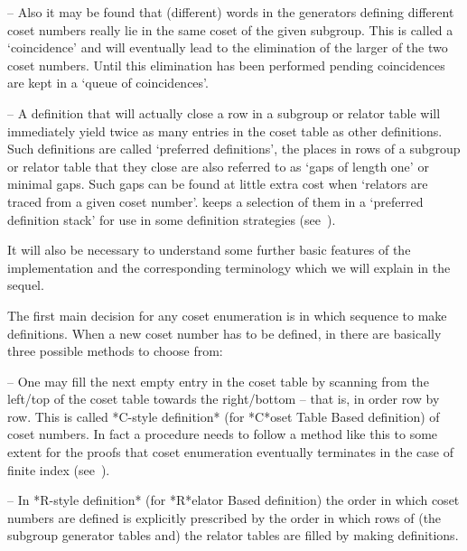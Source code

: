 \item{--} Also   it  may  be  found  that  (different)  words  in  the
generators defining different coset numbers really  lie  in  the  same
coset of the given subgroup. This is called  a  \lq{}coincidence'  and
will eventually lead to the elimination of the larger of the two coset
numbers.  Until  this   elimination   has   been   performed   pending
coincidences are kept in a \lq{}queue of coincidences'.

\item{--} A definition that will actually close a row in a subgroup or
relator table will immediately yield twice  as  many  entries  in  the
coset  table  as  other  definitions.  Such  definitions  are   called
\lq{}preferred definitions', the places  in  rows  of  a  subgroup  or
relator table that they close are also referred  to  as  \lq{}gaps  of
length one' or minimal gaps. Such gaps can be found  at  little  extra
cost when \lq{}relators are traced from a given coset number'.  {\ACE}
keeps a selection of them in a \lq{}preferred  definition  stack'  for
use in some definition strategies (see~\cite{Hav91}).

\endlist

It will also be necessary to understand some further basic features of
the  implementation and  the corresponding  terminology which  we will
explain in the sequel.


The first main decision for any coset enumeration is in which sequence
to make definitions. When a new coset number has  to  be  defined,  in
{\ACE} there are basically three possible methods to choose from:

\beginlist

\item{--} One may fill the next empty entry  in  the  coset  table  by
scanning from the left/top of the coset table towards the right/bottom
-- that is, in order row by row. This is called  *C-style  definition*
(for *C*oset Table Based definition)  of  coset  numbers.  In  fact  a
procedure needs to follow a method like this to some  extent  for  the
proofs that coset enumeration eventually terminates  in  the  case  of
finite index (see~\cite{Neu82}).

\item{--} In *R-style definition* (for *R*elator Based definition) the
order in which coset numbers are defined is explicitly  prescribed  by
the order in which rows of (the subgroup  generator  tables  and)  the
relator tables are filled by making definitions.

